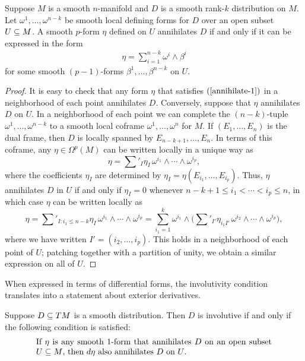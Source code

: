 \begin{lemma}\label{distribution annihilate iff}
Suppose $M$ is a smooth $n$-manifold and $D$ is a smooth rank-$k$ distribution on $M$. Let $\omega^1,\dots,\omega^{n-k}$ be smooth local defining forms for $D$ over an open subset $U\subseteq M$. A smooth $p$-form $\eta$ defined on $U$ annihilates $D$ if and only if it can be expressed in the form
\begin{align}\label{annihilate-1}
\eta=\sum_{i=1}^{n-k}\omega^i\wedge\beta^i
\end{align}
for some smooth $(p-1)$-forms $\beta^1,\dots,\beta^{n-k}$ on $U$.
\end{lemma}
\begin{proof}
It is easy to check that any form $\eta$ that satisfies $(\ref{annihilate-1})$ in a neighborhood of each point annihilates $D$. Conversely, suppose that $\eta$ annihilates $D$ on $U$. In a neighborhood of each point we can complete the $(n-k)$-tuple $\omega^1,\dots,\omega^{n-k}$ to a smooth local coframe $\omega^1,\dots,\omega^n$ for $M$. If $(E_1,\dots,E_n)$ is the dual frame, then $D$ is locally spanned by $E_{n-k+1},\dots,E_n$. In terms of this coframe, any $\eta\in\Omega^p(M)$ can be written locally in a unique way as
\[\eta=\sum'_{I}\eta_I\,\omega^{i_1}\wedge\cdots\wedge\omega^{i_p},\]
where the coefficients $\eta_I$ are determined by $\eta_I=\eta(E_{i_1},\dots,E_{i_p})$. Thus, $\eta$ annihilates $D$ in $U$ if and only if $\eta_I=0$ whenever $n-k+1\leq i_1<\cdots<i_p\leq n$, in which case $\eta$ can be written locally as
\[\eta=\sum'_{I:i_1\leq n-k}\eta_I\,\omega^{i_1}\wedge\cdots\wedge\omega^{i_p}=\sum_{i_1=1}^{k}\omega^{i_1}\wedge\Big(\sum'_{I'}\eta_{i_1I'}\,\omega^{i_2}\wedge\cdots\wedge\omega^{i_p}\Big),\]
where we have written $I'=(i_2,\dots,i_p)$. This holds in a neighborhood of each point of $U$; patching together with a partition of unity, we obtain a similar expression on all of $U$.
\end{proof}
When expressed in terms of differential forms, the involutivity condition translates
into a statement about exterior derivatives.
\begin{theorem}\label{involutivity 1 form crit}
Suppose $D\subseteq TM$ is a smooth distribution. Then $D$ is involutive if and only if the following condition is satisfied:
\begin{equation}\label{involutivity 1 form crit-1}
\parbox{\dimexpr\linewidth-6em}
{\strut
If $\eta$ is any smooth $1$-form that annihilates $D$ on an open subset $U\sub M$, then $d\eta$ also annihilates $D$ on $U$.
\strut}
\end{equation}
\end{theorem}
